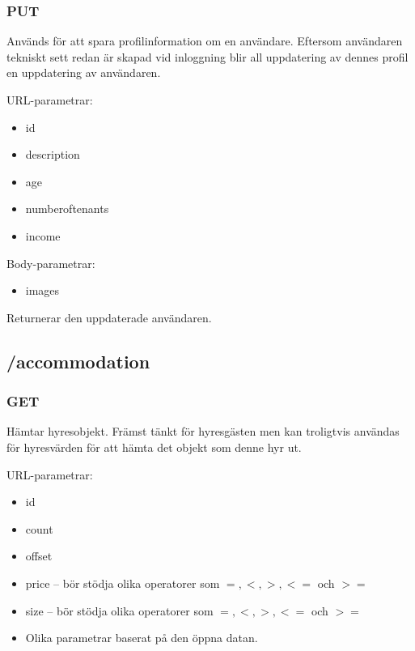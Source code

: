 \documentclass{article}
\begin{document}
\subsubsection {PUT}
\label{ssub:PUT}

Används för att spara profilinformation om en användare. Eftersom användaren tekniskt sett redan är skapad vid inloggning blir all uppdatering av
dennes profil en uppdatering av användaren.

URL-parametrar:

\begin{itemize}
    \item id
    \item description
    \item age
    \item numberoftenants
    \item income
\end{itemize}

Body-parametrar:

\begin{itemize}
    \item images
\end{itemize}

Returnerar den uppdaterade användaren.

\subsection {/accommodation}
\label{sub:/accommodation}

\subsubsection {GET}
\label{ssub:GET}

Hämtar hyresobjekt. Främst tänkt för hyresgästen men kan troligtvis användas för hyresvärden för att hämta det objekt som denne hyr ut.

URL-parametrar:

\begin{itemize}
    \item id
    \item count
    \item offset
    \item price -- bör stödja olika operatorer som \(=, <, >, <=\) och \(>=\)
    \item size -- bör stödja olika operatorer som \(=, <, >, <=\) och \(>=\)
    \item Olika parametrar baserat på den öppna datan.
\end{itemize}
\end{document}
